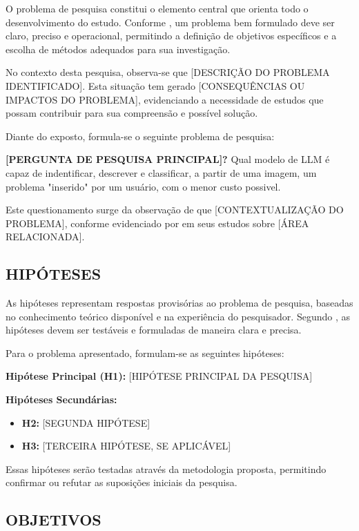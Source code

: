 \documentclass[
    12pt,        %
    openany,     %
    oneside,     %
    a4paper,     %
    english,     %
    brazil,      %
    article      %
]{abntex2}
\begin{document}
O problema de pesquisa constitui o elemento central que orienta todo o desenvolvimento do estudo. Conforme , um problema bem formulado deve ser claro, preciso e operacional, permitindo a definição de objetivos específicos e a escolha de métodos adequados para sua investigação.

No contexto desta pesquisa, observa-se que [DESCRIÇÃO DO PROBLEMA IDENTIFICADO]. Esta situação tem gerado [CONSEQUÊNCIAS OU IMPACTOS DO PROBLEMA], evidenciando a necessidade de estudos que possam contribuir para sua compreensão e possível solução.

Diante do exposto, formula-se o seguinte problema de pesquisa:

\textbf{[PERGUNTA DE PESQUISA PRINCIPAL]?}
Qual modelo de LLM é capaz de indentificar, descrever e classificar, a partir de uma imagem, um problema "inserido" por um usuário, com o menor custo possivel.
 
Este questionamento surge da observação de que [CONTEXTUALIZAÇÃO DO PROBLEMA], conforme evidenciado por  em seus estudos sobre [ÁREA RELACIONADA].


\subsection{HIPÓTESES}
\label{subsec:hipoteses}   

As hipóteses representam respostas provisórias ao problema de pesquisa, baseadas no conhecimento teórico disponível e na experiência do pesquisador. Segundo , as hipóteses devem ser testáveis e formuladas de maneira clara e precisa.

Para o problema apresentado, formulam-se as seguintes hipóteses:

\textbf{Hipótese Principal (H1):} [HIPÓTESE PRINCIPAL DA PESQUISA]

\textbf{Hipóteses Secundárias:}
\begin{itemize}
    \item \textbf{H2:} [SEGUNDA HIPÓTESE]
    \item \textbf{H3:} [TERCEIRA HIPÓTESE, SE APLICÁVEL]
\end{itemize}

Essas hipóteses serão testadas através da metodologia proposta, permitindo confirmar ou refutar as suposições iniciais da pesquisa.


\subsection{OBJETIVOS}
\label{subsec:objetivos}
\end{document}
